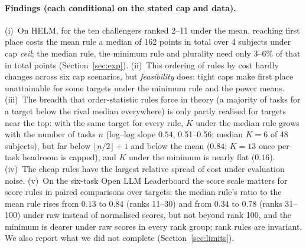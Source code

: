 \paragraph{Findings (each conditional on the stated cap and data).}
(i)~On HELM, for the ten challengers ranked 2--11 under the mean, reaching first place costs the mean rule a median of 162 points in total over 4 subjects under cap \emph{ceil}; the median rule, the minimum rule and plurality need only 3--6\% of that in total points (Section~\ref{sec:exp}). (ii)~This ordering of rules by cost hardly changes across six cap scenarios, but \emph{feasibility} does: tight caps make first place unattainable for some targets under the minimum rule and the power means. (iii)~The breadth that order-statistic rules force in theory (a majority of tasks for a target below the rival median everywhere) is only partly realised for targets near the top: with the same target for every rule, $K$ under the median rule grows with the number of tasks $n$ (log--log slope $0.54$, 0.51--0.56; median $K=6$ of 48 subjects), but far below $\lfloor n/2\rfloor+1$ and below the mean ($0.84$; $K=13$ once per-task headroom is capped), and $K$ under the minimum is nearly flat ($0.16$). (iv)~The cheap rules have the largest relative spread of cost under evaluation noise. (v)~On the six-task Open LLM Leaderboard the score scale matters for score rules in paired comparisons over targets: the median rule's ratio to the mean rule rises from $0.13$ to $0.84$ (ranks 11--30) and from $0.34$ to $0.78$ (ranks 31--100) under raw instead of normalised scores, but not beyond rank 100, and the minimum is dearer under raw scores in every rank group; rank rules are invariant. We also report what we did not complete (Section~\ref{sec:limits}).
